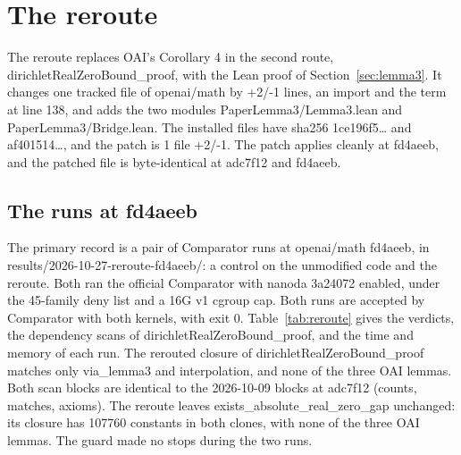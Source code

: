 \section{The reroute}\label{sec:reroute}

The reroute replaces OAI's Corollary 4 in the second route, dirichletRealZeroBound\_proof, with the Lean proof of Section~\ref{sec:lemma3}. %
It changes one tracked file of openai/math by +2/-1 lines, an import and the term at line 138, and adds the two modules PaperLemma3/Lemma3.lean and PaperLemma3/Bridge.lean. %
The installed files have sha256 1ce196f5\ldots{} and af401514\ldots{}, and the patch is 1 file +2/-1. %
The patch applies cleanly at fd4aeeb, and the patched file is byte-identical at adc7f12 and fd4aeeb. %

\subsection{The runs at fd4aeeb}

The primary record is a pair of Comparator runs at openai/math fd4aeeb, in results/2026-10-27-reroute-fd4aeeb/: a control on the unmodified code and the reroute. %
Both ran the official Comparator with nanoda 3a24072 enabled, under the 45-family deny list and a 16G v1 cgroup cap. %
Both runs are accepted by Comparator with both kernels, with exit 0. %
Table~\ref{tab:reroute} gives the verdicts, the dependency scans of dirichletRealZeroBound\_proof, and the time and memory of each run. %
The rerouted closure of dirichletRealZeroBound\_proof matches only via\_lemma3 and interpolation, and none of the three OAI lemmas. %
Both scan blocks are identical to the 2026-10-09 blocks at adc7f12 (counts, matches, axioms). %
The reroute leaves exists\_absolute\_real\_zero\_gap unchanged: its closure has 107760 constants in both clones, with none of the three OAI lemmas. %
The guard made no stops during the two runs. %

